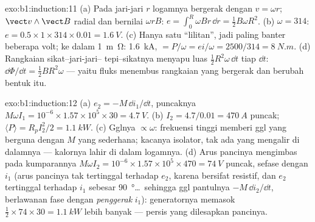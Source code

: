 \begin{solution}{exo:b1:induction:11}
(a) Pada jari-jari $r$ logamnya bergerak dengan $v = \omega r$; $\vect v\wedge\vect B$
radial dan bernilai $\omega rB$: $e = \int_0^R\omega Br\,\dd r = \tfrac12B\omega R^2$.
(b) $\omega = 314$: $e = 0.5 \times 1 \times 314 \times 0.01 = \qty{1.6}{V}$. (c) Hanya satu
``lilitan'', jadi paling banter beberapa volt; ke dalam \qty{1}{m\ohm}: \qty{1.6}{kA}, 
$= P/\omega = ei/\omega = 2500/314 = \qty{8}{N.m}$. (d) Rangkaian sikat--jari-jari--
tepi--sikatnya menyapu luas $\tfrac12R^2\omega\,\dd t$ tiap $\dd t$: $\dd\Phi/\dd t =
\tfrac12BR^2\omega$ --- yaitu fluks menembus rangkaian yang bergerak dan berubah bentuk itu.
\end{solution}

\begin{solution}{exo:b1:induction:12}
(a) $e_2 = -M\,\dd i_1/\dd t$, puncaknya $M\omega I_1 = 10^{-6} \times 1.57 \times 10^5 \times 30 =
\qty{4.7}{V}$. (b) $I_2 = 4.7/0.01 = \qty{470}{A}$ puncak; $\langle P\rangle = R_pI_2^2/2
= \qty{1.1}{kW}$. (c) Gglnya $\propto\omega$: frekuensi tinggi memberi ggl
yang berguna dengan $M$ yang sederhana; kacanya isolator, tak ada yang mengalir di dalamnya
--- kalornya lahir di dalam logamnya. (d) Arus pancinya mengimbas pada
kumparannya $M\omega I_2 = 10^{-6} \times 1.57 \times 10^5 \times 470 = \qty{74}{V}$ puncak,
sefase dengan $i_1$ (arus pancinya tak tertinggal terhadap $e_2$, karena
bersifat resistif, dan $e_2$ tertinggal terhadap $i_1$ sebesar \qty{90}{\degree}\ldots\ sehingga
ggl pantulnya $-M\,\dd i_2/\dd t$, berlawanan fase dengan 
\emph{penggerak} $i_1$): generatornya memasok $\tfrac12 \times 74 \times 30 =
\qty{1.1}{kW}$ lebih banyak --- persis yang dilesapkan pancinya.
\end{solution}

